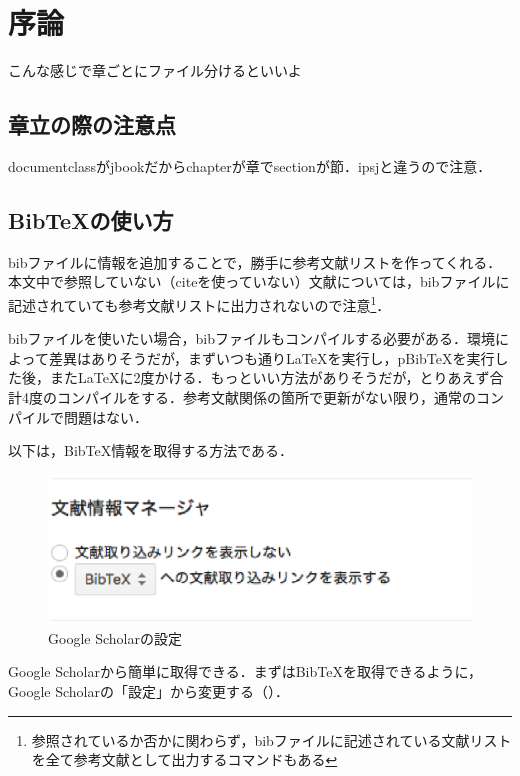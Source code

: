\chapter{序論}
こんな感じで章ごとにファイル分けるといいよ


\section{章立の際の注意点}
documentclassがjbookだからchapterが章でsectionが節．ipsjと違うので注意．


\section{BibTeXの使い方}

bibファイルに情報を追加することで，勝手に参考文献リストを作ってくれる．本文中で参照していない（citeを使っていない）文献については，bibファイルに記述されていても参考文献リストに出力されないので注意\footnote{参照されているか否かに関わらず，bibファイルに記述されている文献リストを全て参考文献として出力するコマンドもある}．

bibファイルを使いたい場合，bibファイルもコンパイルする必要がある．環境によって差異はありそうだが，まずいつも通りLaTeXを実行し，pBibTeXを実行した後，またLaTeXに2度かける．もっといい方法がありそうだが，とりあえず合計4度のコンパイルをする．参考文献関係の箇所で更新がない限り，通常のコンパイルで問題はない．

以下は，BibTeX情報を取得する方法である．


\begin{figure}[h]
	\begin{center}	
		\includegraphics[width=\linewidth]{img/setting.eps}
		\caption{Google Scholarの設定}
		\label{fig:setting}
	\end{center}
\end{figure}


Google Scholarから簡単に取得できる．まずはBibTeXを取得できるように，Google Scholarの「設定」から変更する（）．


